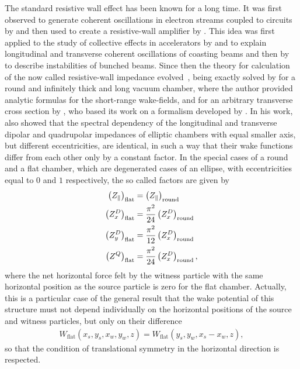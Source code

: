     The standard resistive wall effect has been known for a long time. It was first observed to generate coherent oscillations in electron streams coupled to circuits by  and then used to create a resistive-wall amplifier by . This idea was first applied to the study of collective effects in accelerators by  and  to explain longitudinal and transverse coherent oscillations of coasting beams and then by  to describe instabilities of bunched beams. Since then the theory for calculation of the now called resistive-wall impedance evolved~\cite{Chao1993}, being exactly solved by  for a round and infinitely thick and long vacuum chamber, where the author provided analytic formulas for the short-range wake-fields, and for an arbitrary transverse cross section by , who based its work on a formalism developed by . In his work, \citeauthor{Yokoya1993} also showed that the spectral dependency of the longitudinal and transverse dipolar and quadrupolar impedances of elliptic chambers with equal smaller axis, but different eccentricities, are identical, in such a way that their wake functions differ from each other only by a constant factor. In the special cases of a round and a flat chamber, which are degenerated cases of an ellipse, with eccentricities equal to $0$ and $1$ respectively, the so called \citeauthor{Yokoya1993} factors are given by
    \begin{align}
        \left(Z_\parallel\right)_\text{flat} &=
                        \left(Z_\parallel\right)_\text{round}\\
        \left(Z_x^D\right)_\text{flat} &= \frac{\pi^2}{24}
                        \left(Z_x^D\right)_\text{round}\\
        \left(Z_y^D\right)_\text{flat} &= \frac{\pi^2}{12}
                        \left(Z_x^D\right)_\text{round}\\
        \left(Z^Q\right)_\text{flat} &= \frac{\pi^2}{24}
                        \left(Z_x^D\right)_\text{round},
    \end{align}
    where the net horizontal force felt by the witness particle with the same horizontal position as the source particle is zero for the flat chamber. Actually, this is a particular case of the general result that the wake potential of this structure must not depend individually on the horizontal positions of the source and witness particles, but only on their difference
    \begin{align}\nonumber
        W_\text{flat}(x_s,y_s,x_w,y_w,z)=W_\text{flat}(y_s,y_w,x_s-x_w,z),
    \end{align}
    so that the condition of translational symmetry in the horizontal direction is respected.


